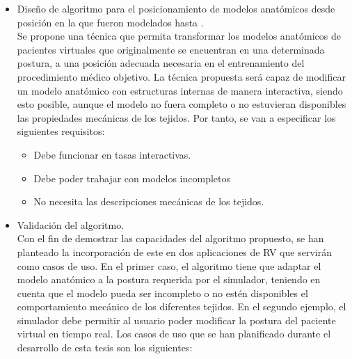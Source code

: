 \begin{itemize}
\item Diseño de algoritmo para el posicionamiento de modelos anatómicos desde  posición en la que fueron modelados hasta .
\\
Se propone una técnica que permita transformar los modelos anatómicos de pacientes virtuales que originalmente se encuentran en una determinada postura, a una posición adecuada necesaria en el entrenamiento del procedimiento médico objetivo. 
La técnica propuesta será capaz de modificar un modelo anatómico con estructuras internas de manera interactiva, siendo esto posible, aunque el modelo no fuera completo o no estuvieran disponibles las propiedades mecánicas de los tejidos. Por tanto, se van a especificar los siguientes requisitos: 

\begin{itemize}
    \item Debe funcionar en tasas interactivas.
    \item Debe poder trabajar con modelos incompletos
    \item No necesita las descripciones mecánicas de los tejidos.
    
\end{itemize}


\item 	Validación del algoritmo. \\
Con el fin de demostrar las capacidades del algoritmo propuesto, se han planteado la incorporación de este en dos aplicaciones de \ac{RV} que servirán como casos de uso. En el primer caso, el algoritmo tiene que adaptar el modelo anatómico a la postura requerida por el simulador, teniendo en cuenta que el modelo pueda ser incompleto o no estén disponibles el comportamiento mecánico de los diferentes tejidos. En el segundo ejemplo, el simulador debe permitir al usuario poder modificar la postura del paciente virtual en tiempo real. Los casos de uso que se han planificado durante el desarrollo de esta tesis son los siguientes: 


\end{itemize}
